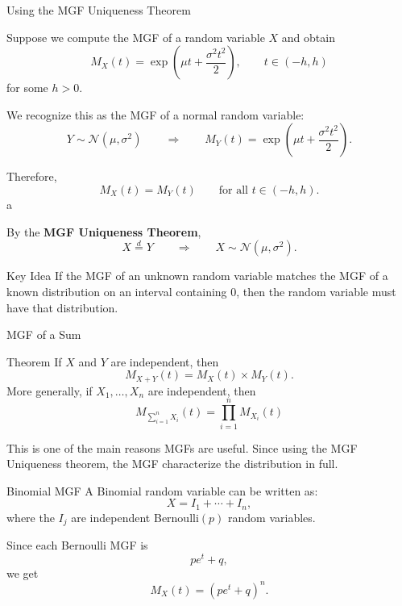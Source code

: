 \begin{frame}{Using the MGF Uniqueness Theorem}

Suppose we compute the MGF of a random variable $X$ and obtain
\[
M_X(t)
=
\exp\left(\mu t+\frac{\sigma^2t^2}{2}\right),
\qquad t\in(-h,h)
\]
for some $h>0$.

\vspace{0.2cm}

We recognize this as the MGF of a normal random variable:
\[
Y\sim\mathcal N(\mu,\sigma^2)
\qquad\Longrightarrow\qquad
M_Y(t)
=
\exp\left(\mu t+\frac{\sigma^2t^2}{2}\right).
\]

Therefore,
\[
M_X(t)=M_Y(t)
\qquad\text{for all }t\in(-h,h).
\] a 

By the \textbf{MGF Uniqueness Theorem},
\[
\boxed{X\overset{d}{=}Y}
\qquad\Longrightarrow\qquad
\boxed{X\sim\mathcal N(\mu,\sigma^2).}
\]

\vspace{0.3cm}

\begin{keybox}{Key Idea}
If the MGF of an unknown random variable matches the MGF of a known
distribution on an interval containing $0$, then the random variable
must have that distribution.
\end{keybox}

\end{frame}




\begin{frame}{MGF of a Sum}
\begin{keybox}{Theorem}
If $X$ and $Y$ are independent, then
\[
{
M_{X+Y}(t)
=
M_X(t)\times M_Y(t).
}
\]
More generally, if $X_1,\dots, X_n$ are independent, then
$$
M_{\sum_{i=1}^n X_i}(t)
=
\prod_{i=1}^nM_{X_i}(t)
$$
\end{keybox}

This is one of the main reasons MGFs are useful. Since using the MGF Uniqueness theorem, the MGF characterize the distribution in full.
\end{frame}

\begin{frame}{Binomial MGF}
A Binomial random variable can be written as:
\[
X=I_1+\cdots+I_n,
\]
where the $I_j$ are independent Bernoulli$(p)$ random variables.

\vspace{0.25cm}

Since each Bernoulli MGF is
\[
pe^t+q,
\]
we get
\[
{
M_X(t)
=
(pe^t+q)^n.
}
\]
\end{frame}

